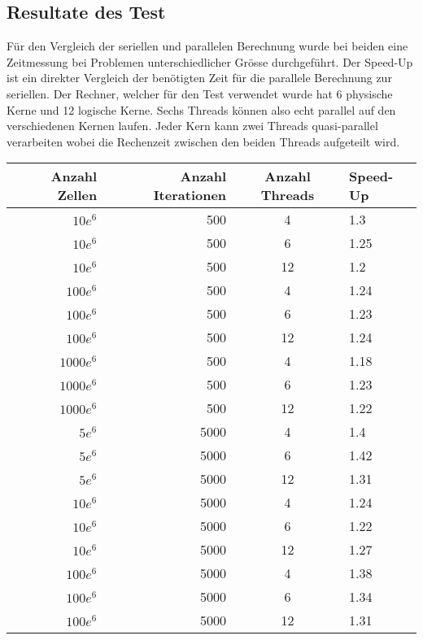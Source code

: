 \subsection{Resultate des Test
\label{parallelisierung:sub:Test}}

Für den Vergleich der seriellen und parallelen Berechnung wurde bei beiden eine Zeitmessung bei Problemen unterschiedlicher Grösse durchgeführt.
Der Speed-Up ist ein direkter Vergleich der benötigten Zeit für die parallele Berechnung zur seriellen.
Der Rechner, welcher für den Test verwendet wurde hat 6 physische Kerne und 12 logische Kerne. 
Sechs Threads können also echt parallel auf den verschiedenen Kernen laufen.
Jeder Kern kann zwei Threads quasi-parallel verarbeiten wobei die Rechenzeit zwischen den beiden Threads aufgeteilt wird.


\begin{table}
	\centering
	\begin{tabular}{r r c l}
		Anzahl Zellen & Anzahl Iterationen & Anzahl Threads & Speed-Up \\
		\hline
		$10e^6$ & 500 & 4 & 1.3\\
		$10e^6$ & 500 & 6 & 1.25\\
		$10e^6$ & 500 & 12 & 1.2\\
		
		$100e^6$ & 500 & 4 & 1.24\\
		$100e^6$ & 500 & 6 & 1.23\\
		$100e^6$ & 500 & 12 & 1.24\\
		
		$1000e^6$ & 500 & 4 & 1.18\\
		$1000e^6$ & 500 & 6 & 1.23\\
		$1000e^6$ & 500 & 12 & 1.22\\
		
		
		$5e^6$ & 5000 & 4  & 1.4 \\
		$5e^6$ & 5000 & 6  & 1.42 \\
		$5e^6$ & 5000 & 12  & 1.31\\
		
		
		$10e^6$ & 5000 & 4 & 1.24\\
		$10e^6$ & 5000 & 6 & 1.22\\
		$10e^6$ & 5000 & 12 & 1.27\\
		
		$100e^6$ & 5000 & 4 & 1.38\\
		$100e^6$ & 5000 & 6 & 1.34\\
		$100e^6$ & 5000 & 12 & 1.31\\
		

\end{tabular}
\end{table}
